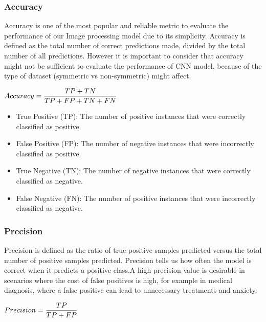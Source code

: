 \documentclass[conference]{IEEEtran}
\begin{document}
\vspace{5pt}
\subsubsection{Accuracy}
Accuracy is one of the most popular and reliable metric to evaluate the performance of our Image processing model due to its simplicity. Accuracy is defined as the total number of correct predictions made, divided by the total number of all predictions. However it is important to consider that accuracy might not be sufficient to evaluate the performance of CNN model, because of the type of dataset (symmetric vs non-symmetric) might affect. 

\vspace{10pt}
$Accuracy = \large\displaystyle\frac{TP + TN}{TP + FP + TN + FN}$
\vspace{10pt}

\begin{itemize}
  \item True Positive (TP): The number of positive instances that were correctly classified as positive.
  \item False Positive (FP): The number of negative instances that were incorrectly classified as positive.
  \item True Negative (TN): The number of negative instances that were correctly classified as negative.
  \item False Negative (FN): The number of positive instances that were incorrectly classified as negative.
\end{itemize}

\vspace{5pt}
\subsubsection{Precision}
Precision is defined as the ratio of true positive samples predicted versus the total number of positive samples predicted. Precision tells us how often the model is correct when it predicts a positive class.A high precision value is desirable in scenarios where the cost of false positives is high, for example in medical diagnosis, where a false positive can lead to unnecessary treatments and anxiety.

\vspace{10pt}
$Precision = \large\displaystyle\frac{TP}{TP + FP}$
\vspace{10pt}

\vspace{5pt}
\end{document}
